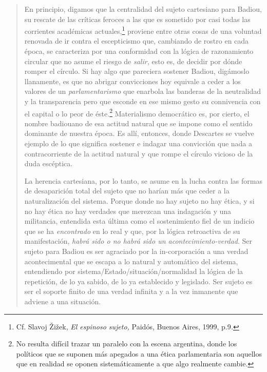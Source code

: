 \begin{quote}
En principio, digamos que la centralidad del sujeto cartesiano para Badiou, su rescate de las críticas feroces a las que es sometido por casi todas las corrientes académicas actuales,\footnote{Cf. Slavoj Žižek, \emph{El espinoso sujeto,} Paidós, Buenos Aires, 1999, p.9\emph{.}} proviene entre otras cosas de una voluntad renovada de ir contra el escepticismo que, cambiando de rostro en cada época, se caracteriza por una conformidad con la lógica de razonamiento circular que no asume el riesgo de \emph{salir,} esto es, de decidir por dónde romper el círculo. Si hay algo que pareciera sostener Badiou, digámoslo llanamente, es que no abrigar convicciones hoy equivale a ceder a los valores de un \emph{parlamentarismo} que enarbola las banderas de la neutralidad y la transparencia pero que esconde en ese mismo gesto su connivencia con el capital o lo peor de éste.\footnote{No resulta difícil trazar un paralelo con la escena argentina, donde los políticos que se suponen más apegados a una ética parlamentaria son aquellos que en realidad se oponen sistemáticamente a que algo realmente cambie.} Materialismo democrático es, por cierto, el nombre badiouano de esa actitud natural que se impone como el sentido dominante de nuestra época. Es allí, entonces, donde Descartes se vuelve ejemplo de lo que significa sostener e indagar una convicción que nada a contracorriente de la actitud natural y que rompe el círculo vicioso de la duda escéptica.

La herencia cartesiana, por lo tanto, se asume en la lucha contra las formas de desaparición total del sujeto que no harían más que ceder a la naturalización del sistema. Porque donde no hay sujeto no hay ética, y si no hay ética no hay verdades que merezcan una indagación y una militancia, entendida esta última como el sostenimiento fiel de un indicio que se ha \emph{encontrado} en lo real y que, por la lógica retroactiva de su manifestación, \emph{habrá sido o no habrá sido un acontecimiento-verdad}. Ser sujeto para Badiou es ser agraciado por la in-corporación a una verdad acontecimental que se escapa a lo natural y automático del sistema, entendiendo por sistema/Estado/situación/normalidad la lógica de la repetición, de lo ya sabido, de lo ya establecido y legislado. Ser sujeto es ser el soporte finito de una verdad infinita y a la vez inmanente que adviene a una situación.


\end{quote}
